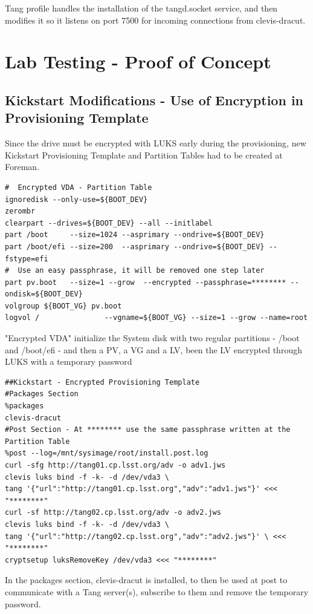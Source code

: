 Tang profile handles the installation of the tangd.socket service, and then modifies it so it listens on port 7500 for incoming connections from clevis-dracut.

\newpage
\section{Lab Testing - Proof of Concept}
\subsection{Kickstart Modifications - Use of Encryption in Provisioning Template}
Since the drive must be encrypted with LUKS early during the provisioning, new Kickstart Provisioning Template and Partition Tables had to be created at Foreman.

\vspace*{0.1mm}
\begin{lstlisting}
#  Encrypted VDA - Partition Table
ignoredisk --only-use=${BOOT_DEV}
zerombr
clearpart --drives=${BOOT_DEV} --all --initlabel
part /boot     --size=1024 --asprimary --ondrive=${BOOT_DEV}
part /boot/efi --size=200  --asprimary --ondrive=${BOOT_DEV} --fstype=efi
#  Use an easy passphrase, it will be removed one step later
part pv.boot   --size=1 --grow  --encrypted --passphrase=******** --ondisk=${BOOT_DEV}
volgroup ${BOOT_VG} pv.boot
logvol /               --vgname=${BOOT_VG} --size=1 --grow --name=root
\end{lstlisting}
\vspace*{0.1mm}
"Encrypted VDA" initialize the System disk with two regular partitions - /boot and /boot/efi - and then a PV, a VG and a LV, been the LV encrypted through LUKS with a temporary password
\vspace*{0.1mm}
\begin{lstlisting}
##Kickstart - Encrypted Provisioning Template
#Packages Section
%packages
clevis-dracut
#Post Section - At ******** use the same passphrase written at the Partition Table
%post --log=/mnt/sysimage/root/install.post.log
curl -sfg http://tang01.cp.lsst.org/adv -o adv1.jws
clevis luks bind -f -k- -d /dev/vda3 \
tang '{"url":"http://tang01.cp.lsst.org","adv":"adv1.jws"}' <<< "********"
curl -sf http://tang02.cp.lsst.org/adv -o adv2.jws
clevis luks bind -f -k- -d /dev/vda3 \
tang '{"url":"http://tang02.cp.lsst.org","adv":"adv2.jws"}' \ <<< "********"
cryptsetup luksRemoveKey /dev/vda3 <<< "********"
\end{lstlisting}
\vspace*{0.1mm}
In the packages section, clevis-dracut is installed, to then be used at post to communicate with a Tang server(s), subscribe to them and remove the temporary password.


